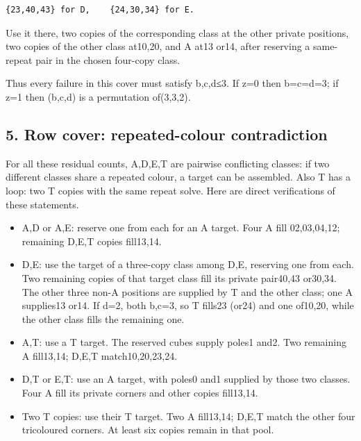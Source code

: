 \documentclass[
  10pt,
]{article}
\providecommand{\tightlist}{%
  \setlength{\itemsep}{0pt}\setlength{\parskip}{0pt}}
\begin{document}
\begin{verbatim}
{23,40,43} for D,    {24,30,34} for E.
\end{verbatim}

Use it there, two copies of the corresponding class at the other private
positions, two copies of the other class at10,20, and A at13 or14, after
reserving a same-repeat pair in the chosen four-copy class.

Thus every failure in this cover must satisfy b,c,d≤3. If z=0 then
b=c=d=3; if z=1 then (b,c,d) is a permutation of(3,3,2).

\hypertarget{row-cover-repeated-colour-contradiction}{%
\subsection*{5. Row cover: repeated-colour
contradiction}\label{row-cover-repeated-colour-contradiction}}

For all these residual counts, A,D,E,T are pairwise conflicting classes:
if two different classes share a repeated colour, a target can be
assembled. Also T has a loop: two T copies with the same repeat solve.
Here are direct verifications of these statements.

\begin{itemize}
\tightlist
\item
  A,D or A,E: reserve one from each for an A target. Four A fill
  02,03,04,12; remaining D,E,T copies fill13,14.
\item
  D,E: use the target of a three-copy class among D,E, reserving one
  from each. Two remaining copies of that target class fill its private
  pair40,43 or30,34. The other three non-A positions are supplied by T
  and the other class; one A supplies13 or14. If d=2, both b,c=3, so T
  fills23 (or24) and one of10,20, while the other class fills the
  remaining one.
\item
  A,T: use a T target. The reserved cubes supply poles1 and2. Two
  remaining A fill13,14; D,E,T match10,20,23,24.
\item
  D,T or E,T: use an A target, with poles0 and1 supplied by those two
  classes. Four A fill its private corners and other copies fill13,14.
\item
  Two T copies: use their T target. Two A fill13,14; D,E,T match the
  other four tricoloured corners. At least six copies remain in that
  pool.
\end{itemize}
\end{document}
